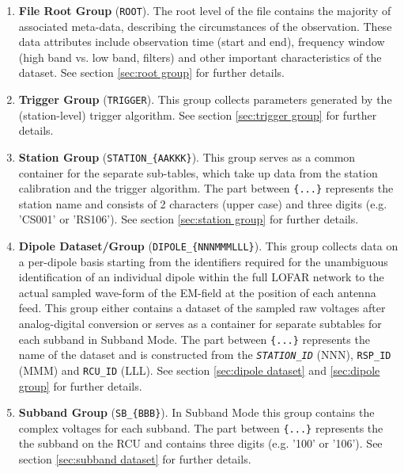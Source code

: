 \documentclass[a4paper,10pt,bibtotoc]{scrartcl}
\begin{document}
\begin{enumerate}
\item \textbf{File Root Group} (\verb|ROOT|). The root level of the file contains the
  majority of associated meta-data, describing the circumstances of
  the observation. These data attributes include observation time
  (start and end), frequency window (high band vs. low band, filters)
  and other important characteristics of the dataset. See
  section \ref{sec:root group} for further details.
\item \textbf{Trigger Group} (\verb|TRIGGER|). This
  group collects parameters generated by the (station-level) trigger
  algorithm. See section \ref{sec:trigger group} for further
  details.
\item \textbf{Station Group} (\verb|STATION_{AAKKK}|). This group serves as a
  common container for the separate sub-tables, which take up data from the
  station calibration and the trigger algorithm. 
  The part between \verb|{...}| represents the station name and consists of 2
  characters (upper case) and three digits (e.g. 'CS001' or 'RS106'). 
  See section \ref{sec:station group} for further details.
\item \textbf{Dipole Dataset/Group} (\verb|DIPOLE_{NNNMMMLLL}|). This group
  collects data on a per-dipole basis starting from the identifiers required for
  the unambiguous identification of an individual dipole within the full LOFAR
  network to the actual sampled wave-form of the EM-field at the position of
  each antenna feed. This group either contains a dataset of the sampled raw voltages after analog-digital conversion
  or serves as a container for separate subtables for each subband in Subband Mode. 
  The part between \verb|{...}| represents the name of the dataset and is
  constructed from the \small \textit{\texttt{STATION\_ID}} (NNN), \verb|RSP_ID|
  (MMM) and \verb|RCU_ID| (LLL). 
  See section \ref{sec:dipole dataset} and \ref{sec:dipole group} for further details.
\item \textbf{Subband Group} (\verb|SB_{BBB}|). In Subband Mode this group contains the complex voltages for each subband. 
  The part between \verb|{...}| represents the the subband on the RCU and contains three digits (e.g. '100' or '106'). 
  See section \ref{sec:subband dataset} for further details.
\end{enumerate}

\end{document}
